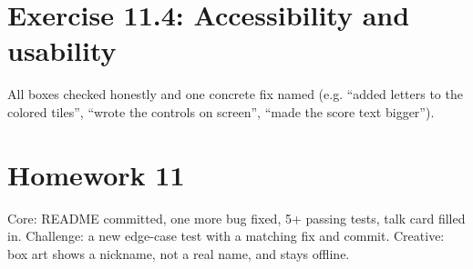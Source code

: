\section{Exercise 11.4: Accessibility and usability}
\begin{answer}
All boxes checked honestly and one concrete fix named (e.g. \enquote{added letters to the colored tiles}, \enquote{wrote the controls on screen}, \enquote{made the score text bigger}).
\end{answer}

\section{Homework 11}
\begin{answer}
Core: README committed, one more bug fixed, 5+ passing tests, talk card filled in. Challenge: a new edge-case test with a matching fix and commit. Creative: box art shows a nickname, not a real name, and stays offline.
\end{answer}

